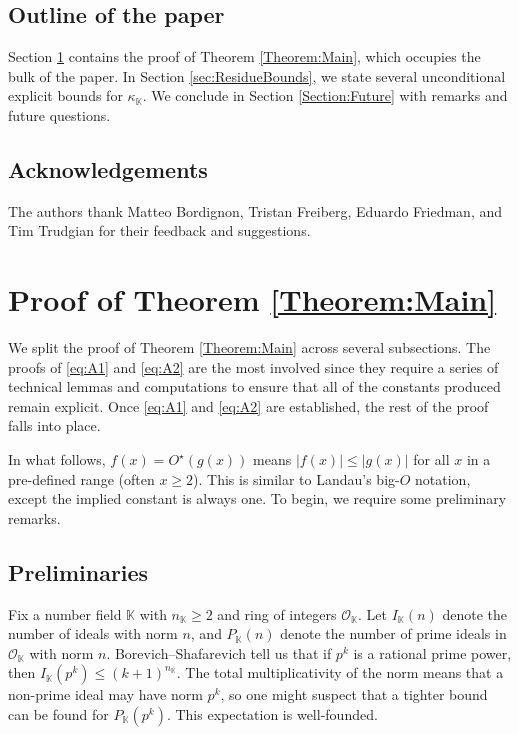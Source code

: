 \documentclass[10pt,reqno]{amsart}
\theoremstyle{plain}
\theoremstyle{definition}
\newcommand{\K}{\mathbb{K}}
\renewcommand{\O}{\mathcal{O}}
\begin{document}
\subsection*{Outline of the paper}
Section \ref{Section:Proof} contains the proof of Theorem \ref{Theorem:Main},
which occupies the bulk of the paper.
In Section \ref{sec:ResidueBounds}, we state several unconditional explicit bounds for $\kappa_{\K}$.
We conclude in Section \ref{Section:Future} with remarks and future questions.

\subsection*{Acknowledgements}
The authors thank Matteo Bordignon, Tristan Freiberg, Eduardo Friedman, and Tim Trudgian for their feedback and suggestions.


\section{Proof of Theorem \ref{Theorem:Main}}\label{Section:Proof}

We split the proof of Theorem \ref{Theorem:Main} across several subsections.  The proofs of \eqref{eq:A1} and \eqref{eq:A2} are the most involved since they require a series of technical lemmas and computations to ensure that all of the constants produced remain explicit.
Once \eqref{eq:A1} and \eqref{eq:A2} are established, the rest of the proof falls into place.

In what follows, $f(x) = O^{\star}(g(x))$ means $|f(x)| \leq |g(x)|$ for all $x$ in a pre-defined range (often
$x \geq 2$).
This is similar to Landau's big-$O$ notation, except the implied constant is always one.
To begin, we require some preliminary remarks.

\subsection{Preliminaries}

Fix a number field $\K$ with $n_{\K}\geq 2$ and ring of integers $\O_{\K}$. 
Let $I_{\K}(n)$ denote the number of ideals with norm $n$, and $P_{\K}(n)$ denote the number of prime ideals in $\O_{\K}$ with norm $n$.
Borevich--Shafarevich \cite[p. 220]{Borevich} tell us that if $p^k$ is a rational prime power, then $I_{\K}(p^k)\leq (k+1)^{n_{\K}}$.
The total multiplicativity of the norm means that a non-prime ideal may have norm $p^k$, so one might suspect that a tighter bound
can be found for $P_{\K}(p^k)$. This expectation is well-founded.
\end{document}

